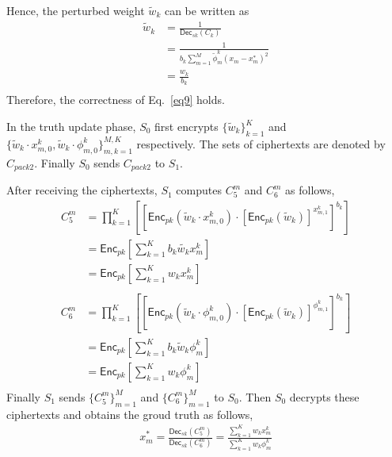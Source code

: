 \documentclass[conference]{IEEEtran}
\begin{document}
Hence, the perturbed weight $\tilde{w}_k$ can be written as
\begin{equation}
  \begin{split}
  \tilde{w}_k & = \frac{1}{\mathsf{Dec}_{sk}\left(C_k\right)} \\
  & = \frac{1}{b_k \sum_{m=1}^M \tilde{\phi}_m^k (x_m - x_m^*)^2} \\
  & = \frac{w_k}{b_k} \\
  \end{split}
\end{equation}
Therefore, the correctness of Eq.~\ref{eq9} holds.

In the truth update phase, $S_0$ first encrypts $\{\tilde{w}_k\}_{k=1}^K$ and $\{\tilde{w}_k\cdot x_{m,0}^k, \tilde{w}_k\cdot \phi_{m,0}^k\}_{m,k=1}^{M,K}$ respectively.
The sets of ciphertexts are denoted by $C_{pack2}$.
Finally $S_0$ sends $C_{pack2}$ to $S_1$.

After receiving the ciphertexts, $S_1$ computes $C_5^m$ and $C_6^m$ as follows,
\begin{equation}
  \begin{split}
    C_5^m & = \prod_{k=1}^K\left[\left[\mathsf{Enc}_{pk}\left(\tilde{w}_k\cdot x_{m,0}^k\right)\cdot \left[\mathsf{Enc}_{pk}\left(\tilde{w}_k\right)\right]^{x_{m,1}^k}\right]^{b_k} \right] \\
    & = \mathsf{Enc}_{pk}\left[\sum_{k=1}^K b_k \tilde{w_k}x_m^k\right]\\
    & = \mathsf{Enc}_{pk}\left[\sum_{k=1}^K w_kx_m^k\right] \\
  \end{split}
\end{equation}
\begin{equation}
  \begin{split}
    C_6^m & = \prod_{k=1}^K \left[ \left[ \mathsf{Enc}_{pk}(\tilde{w}_k\cdot \phi_{m,0}^k) \cdot \left[\mathsf{Enc}_{pk}(\tilde{w}_k)\right]^{\phi_{m,1}^k}\right]^{b_k} \right] \\
     & = \mathsf{Enc}_{pk}\left[\sum_{k=1}^K b_k \tilde{w}_k\phi_m^k \right] \\
     & = \mathsf{Enc}_{pk}\left[\sum_{k=1}^K w_k\phi_m^k \right] \\
  \end{split}
\end{equation}
Finally $S_1$ sends $\{C_5^m\}_{m=1}^M$ and $\{C_6^m\}_{m=1}^M$ to $S_0$.
Then $S_0$ decrypts these ciphertexts and obtains the groud truth as follows,
\begin{equation}
  \begin{split}
    x_m^* = \frac{\mathsf{Dec}_{sk}(C_5^m)}{\mathsf{Dec}_{sk}(C_6^m)} = \frac{\sum_{k=1}^K w_kx_m^k}{\sum_{k=1}^K w_k\phi_m^k}
  \end{split}
\end{equation}
\end{document}
